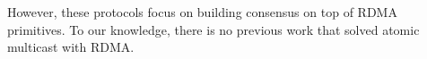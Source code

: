 However, these protocols focus on building consensus on top of RDMA primitives.
To our knowledge, there is no previous work that solved atomic multicast with
RDMA.




